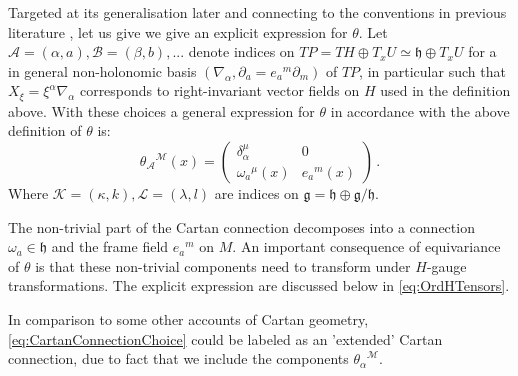 \documentclass[11pt,a4paper]{article}
\numberwithin{equation}{section}
\begin{document}
\begin{enumerate}
\begin{itemize}
    \end{itemize}
    Targeted at its generalisation later and connecting to the conventions in previous literature \cite{Polacek:2013nla,Butter:2022iza}, let us give we give an explicit expression for $\theta$. Let $\mathcal{A}=(\alpha,a),\mathcal{B}=(\beta,b),...$ denote indices on $TP = TH \oplus T_x U \simeq \mathfrak{h} \oplus T_x U$ for a in general non-holonomic basis $(\nabla_\alpha , \partial_a = {e_a}^m \partial_m)$ of $TP$, in particular such that $X_\xi = \xi^\alpha \nabla_\alpha$ corresponds to right-invariant vector fields on $H$ used in the definition above. With these choices a general expression for $\theta$ in accordance with the above definition of $\theta$ is:
    \begin{equation}
    {\theta_{\mathcal{A}}}^{\mathcal{M}}(x) = \left( \begin{array}{cc}
        \delta_\alpha^\mu & 0  \\
        {\omega_a}^{\mu}(x) & {e_a}^m(x) 
    \end{array} \right)\,. \label{eq:CartanConnectionChoice}
    \end{equation}
Where $\mathcal{K}=(\kappa,k),\mathcal{L}=(\lambda,l)$ are indices on $\mathfrak{g} = \mathfrak{h} \oplus \mathfrak{g}/\mathfrak{h}$.


     The non-trivial part of the Cartan connection decomposes into a connection $\omega_a \in \mathfrak{h}$ and the frame field ${e_a}^m$ on $M$. An important consequence of equivariance of $\theta$ is that these non-trivial components need to transform under $H$-gauge transformations. The explicit expression are discussed below in \eqref{eq:OrdHTensors}.
     
     In comparison to some other accounts of Cartan geometry, \eqref{eq:CartanConnectionChoice} could be labeled as an 'extended' Cartan connection, due to fact that we include the components ${\theta_{\alpha}}^\mathcal{M}$. %
    

\end{enumerate}
\end{document}
